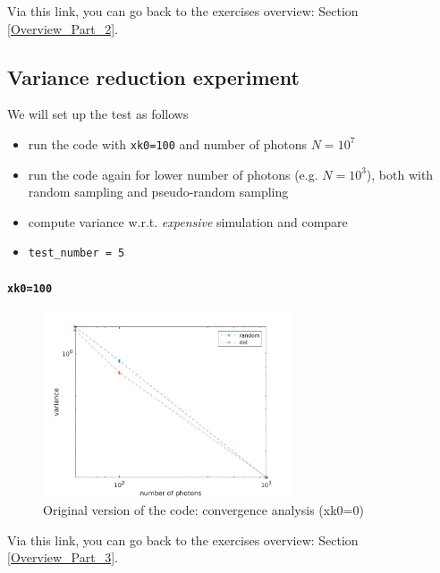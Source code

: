 \documentclass[../main/main.tex]{subfiles}
\begin{document}
Via this link, you can go back to the exercises overview: Section \underline{\ref{Overview_Part_2}}.


\newpage
\subsection{Variance reduction experiment}
\label{variance_reduction_experiment}

We will set up the test as follows
\begin{itemize}
\item run the code with \texttt{xk0=100} and number of photons $N=10^7$
\item run the code again for lower number of photons (e.g. $N=10^3$), both with random sampling and pseudo-random sampling
\item compute variance w.r.t. \textit{expensive} simulation and compare
\item \texttt{test\_number = 5}
\end{itemize}

\paragraph{\texttt{xk0=100}}

\begin{figure}[!htp]
\centering
\includegraphics[width=0.65\textwidth]{../../introductory_exercises/P_Cygni_profile_UV_resonance/data/variance_reduction_test.png}
\caption{Original version of the code: convergence analysis (xk0=0)}
\label{variance_reduction_test}
\end{figure}

\noindent{}

\vspace{0.7cm}
Via this link, you can go back to the exercises overview: Section \underline{\ref{Overview_Part_3}}.
\end{document}

